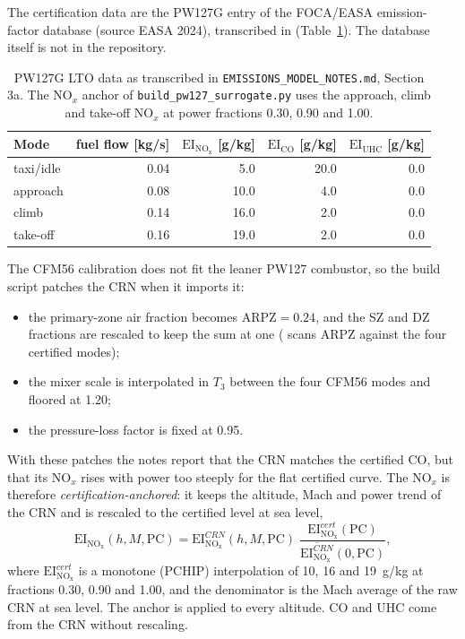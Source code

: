 \documentclass[a4paper,11pt]{article}
\newcommand{\EI}[1]{\mathrm{EI}_{\mathrm{#1}}}
\begin{document}
The certification data are the PW127G entry of the FOCA/EASA emission-factor database (source
EASA 2024), transcribed in  (Table~\ref{tab:pw127-cert}). The
database itself is not in the repository.

\begin{table}[htbp]
\centering\small
\caption{PW127G LTO data as transcribed in \texttt{EMISSIONS\_MODEL\_NOTES.md}, Section 3a. The
NO$_x$ anchor of \texttt{build\_pw127\_surrogate.py} uses the approach, climb and take-off NO$_x$
at power fractions 0.30, 0.90 and 1.00.}\label{tab:pw127-cert}
\begin{tabular}{@{}lrrrr@{}}
\toprule
Mode & fuel flow [kg/s] & $\EI{NO_x}$ [g/kg] & $\EI{CO}$ [g/kg] & $\EI{UHC}$ [g/kg] \\
\midrule
taxi/idle & 0.04 & 5.0 & 20.0 & 0.0 \\
approach & 0.08 & 10.0 & 4.0 & 0.0 \\
climb & 0.14 & 16.0 & 2.0 & 0.0 \\
take-off & 0.16 & 19.0 & 2.0 & 0.0 \\
\bottomrule
\end{tabular}
\end{table}

The CFM56 calibration does not fit the leaner PW127 combustor, so the build script patches the
CRN when it imports it:
\begin{itemize}
\item the primary-zone air fraction becomes $\mathrm{ARPZ} = 0.24$, and the SZ and DZ fractions
  are rescaled to keep the sum at one ( scans ARPZ against the four
  certified modes);
\item the mixer scale is interpolated in $T_3$ between the four CFM56 modes and floored at 1.20;
\item the pressure-loss factor is fixed at 0.95.
\end{itemize}
With these patches the notes report that the CRN matches the certified CO, but that its NO$_x$
rises with power too steeply for the flat certified curve. The NO$_x$ is therefore
\emph{certification-anchored}: it keeps the altitude, Mach and power trend of the CRN and is
rescaled to the certified level at sea level,
\begin{equation}
  \EI{NO_x}(h, M, \mathrm{PC}) = \EI{NO_x}^{CRN}(h, M, \mathrm{PC})\;
  \frac{\EI{NO_x}^{cert}(\mathrm{PC})}{\overline{\EI{NO_x}^{CRN}}(0, \mathrm{PC})},
  \label{eq:anchor}
\end{equation}
where $\EI{NO_x}^{cert}$ is a monotone (PCHIP) interpolation of 10, 16 and \SI{19}{g/kg} at
fractions 0.30, 0.90 and 1.00, and the denominator is the Mach average of the raw CRN at sea
level. The anchor is applied to every altitude. CO and UHC come from the CRN without rescaling.
\end{document}
